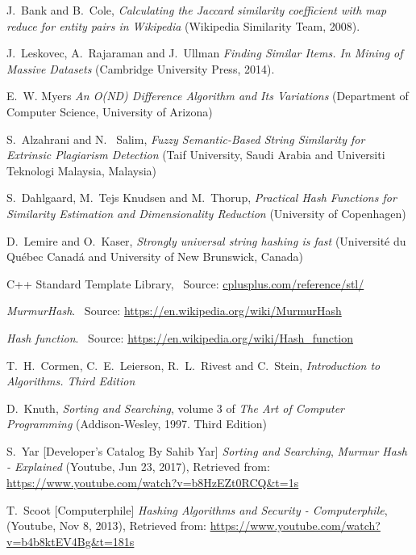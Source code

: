 \documentclass[12pt]{article}
\begin{document}
\clearpage
\begin{thebibliography}{100}

J.\ Bank and B.\ Cole,
\textit {Calculating the Jaccard similarity coefficient with map reduce for entity pairs in
Wikipedia} (Wikipedia Similarity Team, 2008).

J.\ Leskovec, A.\ Rajaraman and J.\ Ullman
\textit{ Finding Similar Items. In Mining of Massive Datasets} (Cambridge University Press, 2014).

E.\ W. Myers \textit{An O(ND) Difference Algorithm and Its Variations} (Department of Computer Science, University of Arizona)

S.\ Alzahrani and N. \ Salim, \textit{Fuzzy Semantic-Based String Similarity for Extrinsic Plagiarism Detection} (Taif University, Saudi Arabia and Universiti Teknologi Malaysia, Malaysia)

S.\ Dahlgaard, M.\ Tejs Knudsen and M.\ Thorup, \textit{Practical Hash Functions for Similarity Estimation and Dimensionality Reduction} (University of Copenhagen)

D.\ Lemire and O.\ Kaser, \textit{Strongly universal string hashing is fast} (Université du Québec Canadá and University of New Brunswick, Canada) 

C++ Standard Template Library,
\ Source: \url{cplusplus.com/reference/stl/}


\textit{MurmurHash}. \ Source: \url{https://en.wikipedia.org/wiki/MurmurHash}

\textit{Hash function}. \ Source: \url{https://en.wikipedia.org/wiki/Hash_function}

T.\ H.\ Cormen, C.\ E.\ Leierson, R.\ L.\ Rivest and C.\ Stein, \textit{Introduction to Algorithms. Third Edition}

D.\ Knuth,
\textit {Sorting and Searching}, volume 3 of \textit{The Art of Computer Programming} (Addison-Wesley, 1997. Third Edition)


S.\ Yar [Developer's Catalog By Sahib Yar]
\textit {Sorting and Searching}, \textit{Murmur Hash - Explained} (Youtube, Jun 23, 2017), Retrieved from: \url{https://www.youtube.com/watch?v=b8HzEZt0RCQ&t=1s}

T.\ Scoot [Computerphile]
\textit {Hashing Algorithms and Security - Computerphile}, (Youtube, Nov 8, 2013), Retrieved from: \url{https://www.youtube.com/watch?v=b4b8ktEV4Bg&t=181s}



\end{thebibliography}
\end{document}
